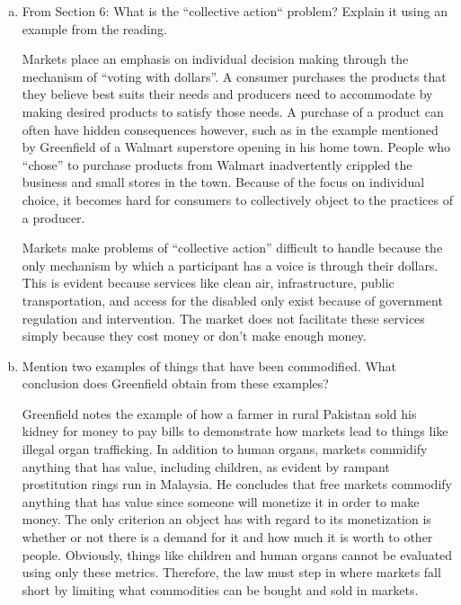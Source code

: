 \documentclass{article}
\begin{document}
\begin{enumerate}[a)]
  \item From Section 6: What is the ``collective action`` problem? Explain it using an example from the reading.
  \par Markets place an emphasis on individual decision making through the mechanism of ``voting with dollars''. A consumer purchases the products that they believe best suits their needs and producers need to accommodate by making desired products to satisfy those needs. A purchase of a product can often have hidden consequences however, such as in the example mentioned by Greenfield of a Walmart superstore opening in his home town. People who ``chose'' to purchase products from Walmart inadvertently crippled the business and small stores in the town. Because of the focus on individual choice, it becomes hard for consumers to collectively object to the practices of a producer.
  \par Markets make problems of ``collective action'' difficult to handle because the only mechanism by which a participant has a voice is through their dollars. This is evident because services like clean air, infrastructure, public transportation, and access for the disabled only exist because of government regulation and intervention. The market does not facilitate these services simply because they cost money or don't make enough money.
  \item Mention two examples of things that have been commodified. What conclusion does Greenfield obtain from these examples?
  \par Greenfield notes the example of how a farmer in rural Pakistan sold his kidney for money to pay bills to demonstrate how markets lead to things like illegal organ trafficking. In addition to human organs, markets commidify anything that has value, including children, as evident by rampant prostitution rings run in Malaysia. He concludes that free markets commodify anything that has value since someone will monetize it in order to make money. The only criterion an object has with regard to its monetization is whether or not there is a demand for it and how much it is worth to other people. Obviously, things like children and human organs cannot be evaluated using only these metrics. Therefore, the law must step in where markets fall short by limiting what commodities can be bought and sold in markets.
\end{enumerate}
\end{document}
